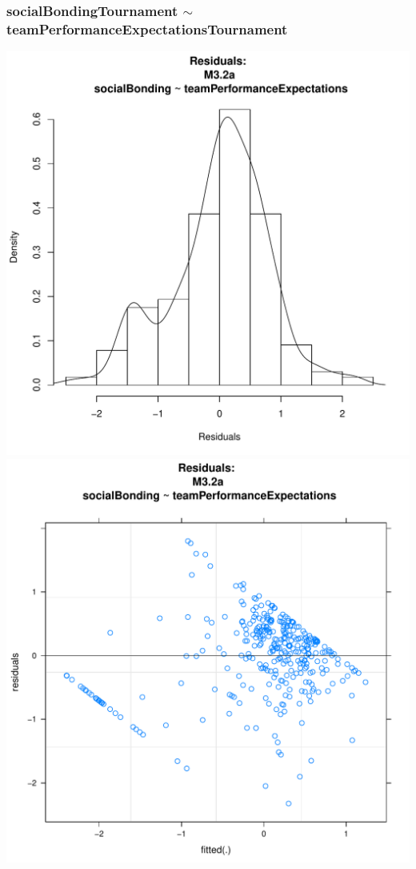 \documentclass[12pt]{report}
\begin{document}
\subsubsection{socialBondingTournament $\sim$ teamPerformanceExpectationsTournament}

\newpage
\centering


\newpage
\centering


\newpage
\centering
\includegraphics[scale =.4]{../images/MLM32aHist.pdf}
\includegraphics[scale =.4]{../images/MLM32aScatter.pdf}
\end{document}
